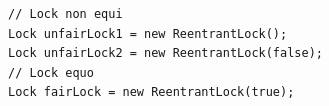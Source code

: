 \begin{lstlisting}
// Lock non equi
Lock unfairLock1 = new ReentrantLock();
Lock unfairLock2 = new ReentrantLock(false);
// Lock equo
Lock fairLock = new ReentrantLock(true);
\end{lstlisting}
